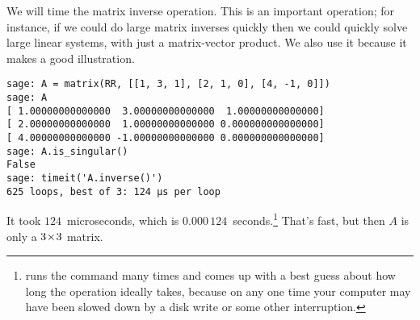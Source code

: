 We will time the matrix inverse operation.
This is an important operation; for instance, if we could do large matrix 
inverses
quickly then we could quickly solve large linear systems, 
with just a matrix-vector product.
We also use it because it makes a good illustration.
\begin{lstlisting}
sage: A = matrix(RR, [[1, 3, 1], [2, 1, 0], [4, -1, 0]])
sage: A
[ 1.00000000000000  3.00000000000000  1.00000000000000]
[ 2.00000000000000  1.00000000000000 0.000000000000000]
[ 4.00000000000000 -1.00000000000000 0.000000000000000]
sage: A.is_singular()
False
sage: timeit('A.inverse()')
625 loops, best of 3: 124 µs per loop
\end{lstlisting}
It took $124$~microseconds, which is 
$0.000\,124$~seconds.\footnote{\protect\Sage{} runs the command 
many times and comes up with a best guess about how long
the operation ideally takes, because on any one time your
computer may have been slowed down by a 
disk write or some other interruption.}
That's fast, but then $A$ is only a $3 \! \times \! 3$ matrix.

